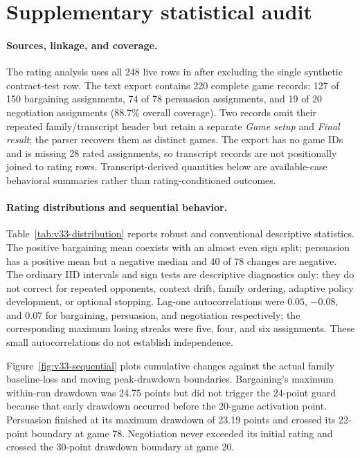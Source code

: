 \section{Supplementary statistical audit}
\label{app:statistics}

\paragraph{Sources, linkage, and coverage.}
The rating analysis uses all 248 live rows in
 after excluding the single synthetic
contract-test row. The text export contains 220 complete game records: 127 of
150 bargaining assignments, 74 of 78 persuasion assignments, and 19 of 20
negotiation assignments (88.7\% overall coverage). Two records omit their
repeated family/transcript header but retain a separate \emph{Game setup} and
\emph{Final result}; the parser recovers them as distinct games. The export has
no game IDs and is missing 28 rated assignments, so transcript records are not
positionally joined to rating rows. Transcript-derived quantities below are
available-case behavioral summaries rather than rating-conditioned outcomes.

\paragraph{Rating distributions and sequential behavior.}
Table~\ref{tab:v33-distribution} reports robust and conventional descriptive
statistics. The positive bargaining mean coexists with an almost even sign
split; persuasion has a positive mean but a negative median and 40 of 78
changes are negative. The ordinary IID intervals and sign tests are descriptive
diagnostics only: they do not correct for repeated opponents, context drift,
family ordering, adaptive policy development, or optional stopping. Lag-one
autocorrelations were $0.05$, $-0.08$, and $0.07$ for bargaining, persuasion,
and negotiation respectively; the corresponding maximum losing streaks were
five, four, and six assignments. These small autocorrelations do not establish
independence.

Figure~\ref{fig:v33-sequential} plots cumulative changes against the actual
family baseline-loss and moving peak-drawdown boundaries. Bargaining's maximum
within-run drawdown was 24.75 points but did not trigger the 24-point guard
because that early drawdown occurred before the 20-game activation point.
Persuasion finished at its maximum drawdown of 23.19 points and crossed its
22-point boundary at game 78. Negotiation never exceeded its initial rating and
crossed the 30-point drawdown boundary at game 20.


